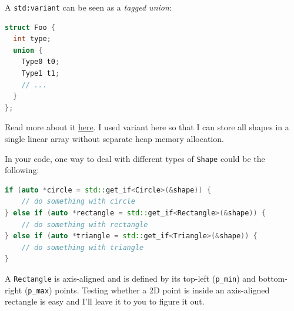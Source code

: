A \lstinline{std:variant} can be seen as a \emph{tagged union}:
\begin{lstlisting}[language=C++]
struct Foo {
  int type;
  union {
    Type0 t0;
    Type1 t1;
    // ...
  }
};
\end{lstlisting}
Read more about it \href{https://www.cppstories.com/2020/04/variant-virtual-polymorphism.html/}{here}. I used variant here so that I can store all shapes in a single linear array without separate heap memory allocation.

In your code, one way to deal with different types of \lstinline{Shape} could be the following:
\begin{lstlisting}[language=C++]
if (auto *circle = std::get_if<Circle>(&shape)) {
    // do something with circle
} else if (auto *rectangle = std::get_if<Rectangle>(&shape)) {
    // do something with rectangle
} else if (auto *triangle = std::get_if<Triangle>(&shape)) {
    // do something with triangle
}
\end{lstlisting}

A \lstinline{Rectangle} is axis-aligned and is defined by its top-left (\lstinline{p_min}) and bottom-right (\lstinline{p_max}) points. Testing whether a 2D point is inside an axis-aligned rectangle is easy and I'll leave it to you to figure it out.

